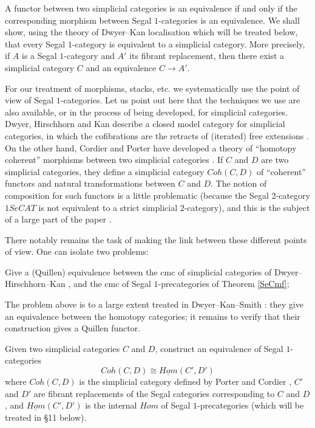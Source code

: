 A functor between two simplicial categories is an equivalence if and only if
the corresponding morphism between Segal $1$-categories is an equivalence. We
shall show, using the theory of Dwyer--Kan localisation which will be treated
below, that every Segal $1$-category is equivalent to a simplicial category.
More precisely, if $A$ is a Segal $1$-category and $A'$ its fibrant
replacement, then there exist a simplicial category $C$ and an equivalence
$C\rightarrow A'$.

For our treatment of morphisms, stacks, etc. we systematically use the point
of view of Segal $1$-categories. Let us point out here that the techniques we
use are also available, or in the process of being developed, for simplicial
categories. Dwyer, Hirschhorn and Kan describe a closed model category for
simplicial categories, in which the cofibrations are the retracts of
(iterated) free extensions \cite{DHK}. On the other hand, Cordier and Porter
have developed a theory of ``homotopy coherent'' morphisms between two
simplicial categories \cite{CordierPorter}. If $C$ and $D$ are two simplicial
categories, they define a simplicial category $Coh(C,D)$ of ``coherent''
functors and natural transformations between $C$ and $D$. The notion of
composition for such functors is a little problematic (because the Segal
$2$-category $1SeCAT$ is not equivalent to a strict simplicial
$2$-category), and this is the subject of a large part of the paper
\cite{CordierPorter}.

There notably remains the task of making the link between these different
points of view. One can isolate two problems:


\begin{problem}
\label{probleme1}
Give a (Quillen) equivalence between the cmc of simplicial categories of
Dwyer--Hirschhorn--Kan \cite{DHK}, and the cmc of Segal $1$-precategories of
Theorem \ref{SeCmf}; %
\end{problem}

The problem above is to a large extent
treated in Dwyer--Kan--Smith \cite{DKS}:
they give an equivalence between the homotopy categories; it remains to
verify that their construction gives a Quillen functor.

\begin{problem}
\label{probleme2}
Given two simplicial
categories $C$ and $D$, construct an equivalence of
Segal $1$-categories
$$
Coh (C,D) \cong \underline{Hom}(C',D')
$$
where $Coh(C,D)$ is the simplicial category defined by Porter and Cordier
\cite{CordierPorter},
$C'$ and $D'$ are fibrant replacements of the
Segal categories corresponding to $C$ and $D$,
and $\underline{Hom}(C',D')$ is the internal $Hom$ of Segal $1$-precategories
(which will be treated in \S 11 below).
\end{problem}

